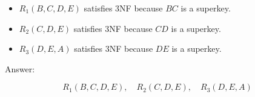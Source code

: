 \documentclass[12pt]{article}
\begin{document}
\begin{enumerate}
	\begin{itemize}
		\item \( R_1(B, C, D, E) \) satisfies 3NF because \( BC \) is a superkey.
		\item \( R_2(C, D, E) \) satisfies 3NF because \( CD \) is a superkey.
		\item \( R_3(D, E, A) \) satisfies 3NF because \( DE \) is a superkey.
	\end{itemize}
	
Answer:

	\[
	R_1(B, C, D, E), \quad R_2(C, D, E), \quad R_3(D, E, A)
	\]
	
\end{enumerate}

	
\end{document}
